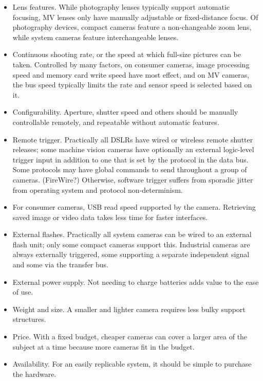 \begin{itemize}
	\item Lens features. While photography lenses typically support automatic focusing, MV lenses only have manually adjustable or fixed-distance focus. Of photography devices, compact cameras feature a non-changeable zoom lens, while system cameras feature interchangeable lenses.

	\item Continuous shooting rate, or the speed at which full-size pictures can be taken. Controlled by many factors, on consumer cameras, image processing speed and memory card write speed have most effect, and on MV cameras, the bus speed typically limits the rate and sensor speed is selected based on it.

	\item Configurability. Aperture, shutter speed and others should be manually controllable remotely, and repeatable without automatic features.

	\item Remote trigger. Practically all DSLRs have wired or wireless remote shutter releases; some machine vision cameras have optionally an external logic-level trigger input in addition to one that is set by the protocol in the data bus. Some protocols may have global commands to send throughout a group of cameras. (FireWire?) Otherwise, software trigger suffers from sporadic jitter from operating system and protocol non-determinism.

	\item For consumer cameras, USB read speed supported by the camera. Retrieving saved image or video data takes less time for faster interfaces.

	\item External flashes. Practically all system cameras can be wired to an external flash unit; only some compact cameras support this. Industrial cameras are always externally triggered, some supporting a separate independent signal and some via the transfer bus.

	\item External power supply. Not needing to charge batteries adds value to the ease of use.

	\item Weight and size. A smaller and lighter camera requires less bulky support structures.

	\item Price. With a fixed budget, cheaper cameras can cover a larger area of the subject at a time because more cameras fit in the budget.

	\item Availability. For an easily replicable system, it should be simple to purchase the hardware.
\end{itemize}

